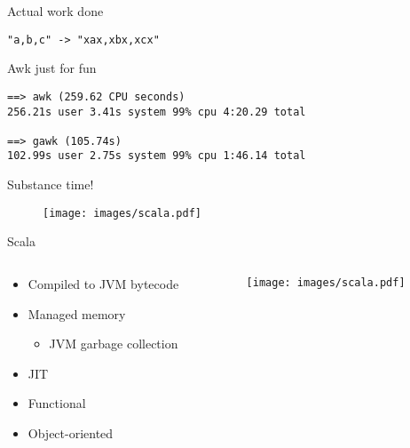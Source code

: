 \documentclass[aspectratio=169,14pt]{beamer}
\newcommand{\megatext}[1]{
  \begin{center}
    \Huge
    #1
  \end{center}
}
\newcommand{\bigtext}[1]{
  \begin{center}
    \Large
    #1
  \end{center}
}
\begin{document}
\begin{frame}{Actual work done}
  \bigtext{\texttt{"a,b,c" -> "xax,xbx,xcx"}}
\end{frame}


\begin{frame}[fragile]{Awk just for fun}
  \begin{verbatim}
==> awk (259.62 CPU seconds)
256.21s user 3.41s system 99% cpu 4:20.29 total

==> gawk (105.74s)
102.99s user 2.75s system 99% cpu 1:46.14 total
  \end{verbatim}
\end{frame}

\begin{frame}
  \megatext{Substance time!}
\end{frame}

\begin{frame}
  \begin{figure}
    \texttt{[image: images/scala.pdf]}
  \end{figure}
\end{frame}


\begin{frame}{Scala}
  \begin{columns}[c]
    \begin{column}{0.6\textwidth}
      \begin{itemize}
      \item Compiled to JVM bytecode
      \item Managed memory
        \begin{itemize}
          \item JVM garbage collection
        \end{itemize}
      \item JIT
      \item Functional
      \item Object-oriented
      \end{itemize}
    \end{column}

    \begin{column}{0.4\textwidth}
      \begin{figure}
        \texttt{[image: images/scala.pdf]}
      \end{figure}
    \end{column}
  \end{columns}
\end{frame}
\end{document}
